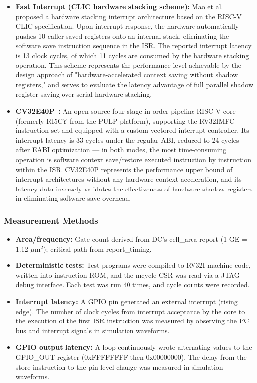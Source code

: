 \documentclass[letterpaper,journal]{IEEEtran}
\begin{document}
\begin{itemize}
\item \textbf{Fast Interrupt (CLIC hardware stacking scheme):} Mao et al.~\cite{ref5} proposed a hardware stacking interrupt architecture based on the RISC-V CLIC specification. Upon interrupt response, the hardware automatically pushes 10 caller-saved registers onto an internal stack, eliminating the software save instruction sequence in the ISR. The reported interrupt latency is 13 clock cycles, of which 11 cycles are consumed by the hardware stacking operation. This scheme represents the performance level achievable by the design approach of "hardware-accelerated context saving without shadow registers," and serves to evaluate the latency advantage of full parallel shadow register saving over serial hardware stacking.

\item \textbf{CV32E40P~\cite{ref6}:} An open-source four-stage in-order pipeline RISC-V core (formerly RI5CY from the PULP platform), supporting the RV32IMFC instruction set and equipped with a custom vectored interrupt controller. Its interrupt latency is 33 cycles under the regular ABI, reduced to 24 cycles after EABI optimization — in both modes, the most time-consuming operation is software context save/restore executed instruction by instruction within the ISR. CV32E40P represents the performance upper bound of interrupt architectures without any hardware context acceleration, and its latency data inversely validates the effectiveness of hardware shadow registers in eliminating software save overhead.
\end{itemize}

\subsubsection{Measurement Methods}
\begin{itemize}
\item \textbf{Area/frequency:} Gate count derived from DC's cell\_area report (1 GE = 1.12 $\mu$m$^2$); critical path from report\_timing.
\item \textbf{Deterministic tests:} Test programs were compiled to RV32I machine code, written into instruction ROM, and the mcycle CSR was read via a JTAG debug interface. Each test was run 40 times, and cycle counts were recorded.
\item \textbf{Interrupt latency:} A GPIO pin generated an external interrupt (rising edge). The number of clock cycles from interrupt acceptance by the core to the execution of the first ISR instruction was measured by observing the PC bus and interrupt signals in simulation waveforms.
\item \textbf{GPIO output latency:} A loop continuously wrote alternating values to the GPIO\_OUT register (0xFFFFFFFF then 0x00000000). The delay from the store instruction to the pin level change was measured in simulation waveforms.
\end{itemize}
\end{document}
